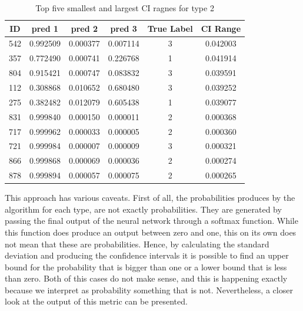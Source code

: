 \documentclass[11pt,twoside]{article}
\numberwithin{Theorem}{section}
\numberwithin{Definition}{section}
\numberwithin{Lemma}{section}
\numberwithin{Algorithm}{section}
\numberwithin{equation}{section}
\begin{document}
\begin{table}[]
\centering
\begin{tabular}{|c|lllcc|}
\hline
ID  & \multicolumn{1}{c}{pred 1}   & \multicolumn{1}{c}{pred 2}   & \multicolumn{1}{c}{pred 3} & True Label & CI Range \\ \hline
542 & 0.992509                     & 0.000377                     & 0.007114                   & 3          & 0.042003 \\
357 & \multicolumn{1}{r}{0.772490} & 0.000741                     & 0.226768                   & 1          & 0.041914 \\
804 & 0.915421                     & 0.000747                     & 0.083832                   & 3          & 0.039591 \\
112 & \multicolumn{1}{r}{0.308868} & 0.010652                     & 0.680480                   & 3          & 0.039252 \\
275 & 0.382482                     & \multicolumn{1}{r}{0.012079} & 0.605438                   & 1          & 0.039077 \\ \hline
831 & 0.999840                     & 0.000150                     & 0.000011                   & 2          & 0.000368 \\
717 & 0.999962                     & 0.000033                     & 0.000005                   & 2          & 0.000360 \\
721 & 0.999984                     & 0.000007                     & 0.000009                   & 3          & 0.000321 \\
866 & 0.999868                     & 0.000069                     & 0.000036                   & 2          & 0.000274 \\
878 & 0.999894                     & 0.000057                     & 0.000075                   & 2          & 0.000265 \\ \hline
\end{tabular}
\label{tab:CI}
\caption{Top five smallest and largest CI ragnes for \textsf{type 2}}
\end{table}

This approach has various caveats. First of all, the probabilities produces by the algorithm for each type, are not exactly probabilities. They are generated by passing the final output of the neural network through a softmax function. While this function does produce an output between zero and one, this on its own does not mean that these are probabilities. Hence, by calculating the standard deviation and producing the confidence intervals it is possible to find an upper bound for the probability that is bigger than one or a lower bound that is less than zero. Both of this cases do not make sense, and this is happening exactly because we interpret as probability something that is not. Nevertheless, a closer look at the output of this metric can be presented. 
\end{document}
